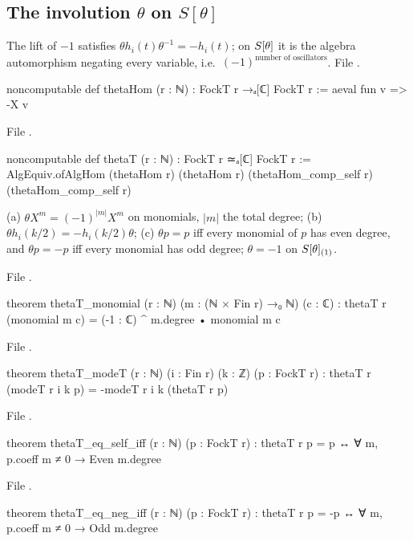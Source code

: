 \subsection{The involution \texorpdfstring{$\theta$}{theta} on \texorpdfstring{$S[\theta]$}{S[theta]}}

The lift of $-1$ satisfies $\theta h_i(t)\theta^{-1}=-h_i(t)$; on $S[\theta]$ it is the algebra
automorphism negating every variable, i.e.\ $(-1)^{\text{number of oscillators}}$.
\noindent File .
\begin{leancode}
noncomputable def thetaHom (r : ℕ) : FockT r →ₐ[ℂ] FockT r := aeval fun v => -X v
\end{leancode}
\noindent File .
\begin{leancode}
noncomputable def thetaT (r : ℕ) : FockT r ≃ₐ[ℂ] FockT r :=
  AlgEquiv.ofAlgHom (thetaHom r) (thetaHom r) (thetaHom_comp_self r) (thetaHom_comp_self r)
\end{leancode}
\begin{theorem}\label{ch06:thm:thetaT}
(a) $\theta X^m=(-1)^{|m|}X^m$ on monomials, $|m|$ the total degree;
(b) $\theta h_i(k/2)=-h_i(k/2)\theta$;
(c) $\theta p=p$ iff every monomial of $p$ has even degree, and $\theta p=-p$ iff every monomial has
odd degree; $\theta=-1$ on $S[\theta]_{(1)}$.
\end{theorem}
\noindent File .
\begin{leancode}
theorem thetaT_monomial (r : ℕ) (m : (ℕ × Fin r) →₀ ℕ) (c : ℂ) :
    thetaT r (monomial m c) = (-1 : ℂ) ^ m.degree • monomial m c
\end{leancode}
\noindent File .
\begin{leancode}
theorem thetaT_modeT (r : ℕ) (i : Fin r) (k : ℤ) (p : FockT r) :
    thetaT r (modeT r i k p) = -modeT r i k (thetaT r p)
\end{leancode}
\noindent File .
\begin{leancode}
theorem thetaT_eq_self_iff (r : ℕ) (p : FockT r) :
    thetaT r p = p ↔ ∀ m, p.coeff m ≠ 0 → Even m.degree
\end{leancode}
\noindent File .
\begin{leancode}
theorem thetaT_eq_neg_iff (r : ℕ) (p : FockT r) :
    thetaT r p = -p ↔ ∀ m, p.coeff m ≠ 0 → Odd m.degree
\end{leancode}
